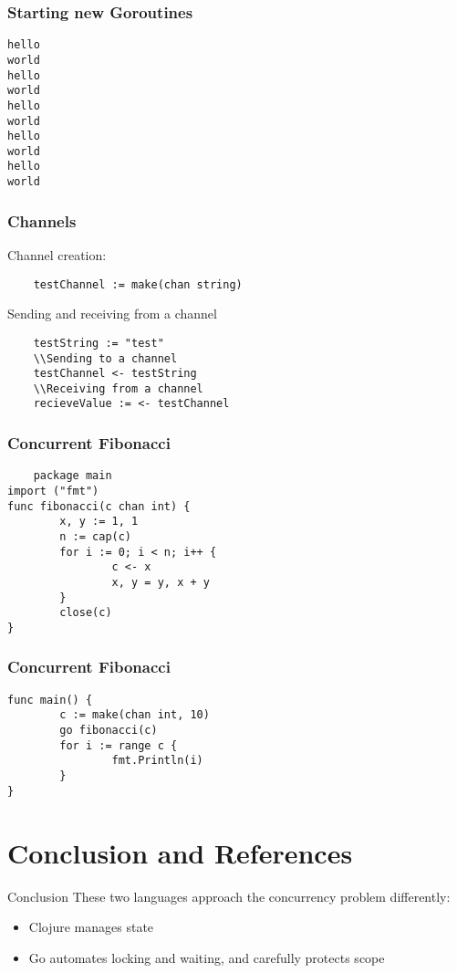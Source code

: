 \documentclass[xcolor=dvipsnames]{beamer}
\begin{document}
	\begin{frame}[fragile]
	\frametitle{Starting new Goroutines}
	\begin{verbatim}
hello
world
hello
world
hello
world
hello
world
hello
world
	\end{verbatim}
	\end{frame}
	
	\begin{frame}[fragile]
	\frametitle{Channels}
	Channel creation:
	\begin{verbatim}
	testChannel := make(chan string)
	\end{verbatim}
	\pause
	Sending and receiving from a channel
	\begin{verbatim}
	testString := "test"
	\\Sending to a channel
	testChannel <- testString 
	\\Receiving from a channel
	recieveValue := <- testChannel 
	\end{verbatim}
	\end{frame}
	
	\begin{frame}[fragile]
	\frametitle{Concurrent Fibonacci}
	\begin{verbatim}
	package main
import ("fmt")
func fibonacci(c chan int) {
       	x, y := 1, 1
       	n := cap(c)
        for i := 0; i < n; i++ {
                c <- x
                x, y = y, x + y
        }
        close(c)
}
	\end{verbatim}
	\end{frame}
	
	\begin{frame}[fragile]
	\frametitle{Concurrent Fibonacci}
	\begin{verbatim}
func main() {
        c := make(chan int, 10)
	    go fibonacci(c)
        for i := range c {
                fmt.Println(i)
        }
}
	\end{verbatim}
	\end{frame}
	\section{Conclusion and References}
	\begin{frame}{Conclusion}
	These two languages approach the concurrency problem differently:
		\begin{itemize}
		\item Clojure manages state
		\item Go automates locking and waiting, and carefully protects scope
		\end{itemize}
	\end{frame}
	
\end{document}
